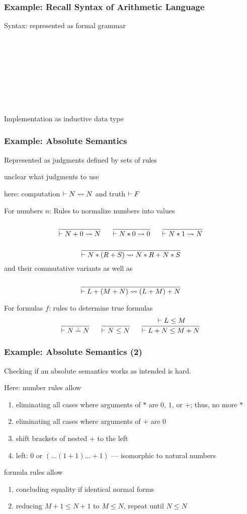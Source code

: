 \begin{frame}\frametitle{Example: Recall Syntax of Arithmetic Language}
Syntax: represented as formal grammar

\begin{commgrammar}
\\
\\
\\
\\
\\
\\
\\
\end{commgrammar}

Implementation as inductive data type
\end{frame}

\begin{frame}\frametitle{Example: Absolute Semantics}
\begin{blockitems}{Represented as judgments defined by sets of rules}
\item unclear what judgments to use
\item here: computation $\vdash N \rightsquigarrow N$ and truth $\vdash F$
\end{blockitems}

For numbers $n$: Rules to normalize numbers into values
\[\cfrac{}{\vdash N+0\rightsquigarrow N}\, \hspace*{.5cm} \cfrac{}{\vdash N*0\rightsquigarrow 0}\,\hspace*{.5cm} \cfrac{}{\vdash N*1\rightsquigarrow N}\,\]
\[\cfrac{}{\vdash N*(R+S)\rightsquigarrow N*R+N*S}\,\]
and their commutative variants as well as
\[\cfrac{}{\vdash L+(M+N)\rightsquigarrow (L+M)+N}\,\]


For formulas $f$: rules to determine true formulas
\[\cfrac{}{\vdash N\doteq N}\, \hspace*{.5cm} \cfrac{}{\vdash N\leq N}\, \hspace*{.5cm} \cfrac{\vdash L\leq M}{\vdash L+N\leq M+N}\,\]
\end{frame}

\begin{frame}\frametitle{Example: Absolute Semantics (2)}
Checking if an absolute semantics works as intended is hard.

Here: number rules allow
\begin{enumerate}
\item eliminating all cases where arguments of $*$ are $0$, $1$, or $+$; thus, no more $*$
\item eliminating all cases where arguments of $+$ are $0$
\item shift brackets of nested $+$ to the left
\item left: $0$ or $(\ldots(1+1)\ldots+1)$ --- isomorphic to natural numbers
\end{enumerate}
formula rules allow
\begin{enumerate}
\item concluding equality if identical normal forms
\item reducing $M+1\leq N+1$ to $M\leq N$, repeat until $N\leq N$
\end{enumerate}
\end{frame}


